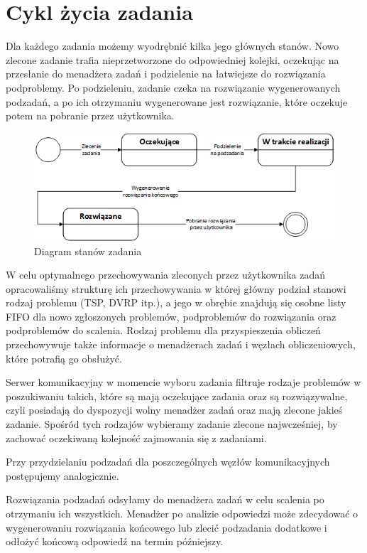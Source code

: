 \documentclass{report}
\begin{document}
\newpage

\section {Cykl życia zadania}

	Dla każdego zadania możemy wyodrębnić kilka jego głównych stanów. Nowo zlecone zadanie
	trafia nieprzetworzone do odpowiedniej kolejki, oczekując na przesłanie do menadżera zadań
	i podzielenie na łatwiejsze do rozwiązania podproblemy. Po podzieleniu, zadanie czeka na rozwiązanie
	wygenerowanych podzadań, a po ich otrzymaniu wygenerowane jest rozwiązanie, które oczekuje potem na
	pobranie przez użytkownika.
	
	\begin{figure}[h]
		\centering
		\includegraphics[width=\textwidth]{img/state/Task.png}
		\caption{Diagram stanów zadania}
	\end{figure}
	
	W celu optymalnego przechowywania zleconych przez użytkownika zadań opracowaliśmy
	strukturę ich przechowywania w której główny podział stanowi rodzaj problemu
	(TSP, DVRP itp.), a jego w obrębie znajdują się osobne listy FIFO dla nowo zgłoszonych problemów,
	podproblemów do rozwiązania oraz podproblemów do scalenia. Rodzaj problemu dla przyspieszenia obliczeń
	przechowywuje także informacje o menadżerach zadań i węzłach obliczeniowych, które potrafią
	go obsłużyć. 
	
	Serwer komunikacyjny w momencie wyboru zadania filtruje rodzaje problemów w poszukiwaniu takich,
	które są mają oczekujące zadania oraz są rozwiązywalne, czyli posiadają do dyspozycji wolny menadżer zadań 
	oraz mają zlecone jakieś zadanie. Spośród tych rodzajów wybieramy zadanie zlecone najwcześniej, by zachować
	oczekiwaną kolejność zajmowania się z zadaniami.
	
	Przy przydzielaniu podzadań dla poszczególnych węzłów komunikacyjnych postępujemy analogicznie.
	
	Rozwiązania podzadań odsyłamy do menadżera zadań w celu scalenia po otrzymaniu ich wszystkich. Menadżer
	po analizie odpowiedzi może zdecydować o wygenerowaniu rozwiązania końcowego lub zlecić podzadania dodatkowe
	i odłożyć końcową odpowiedź na termin późniejszy. 
	
\end{document}
